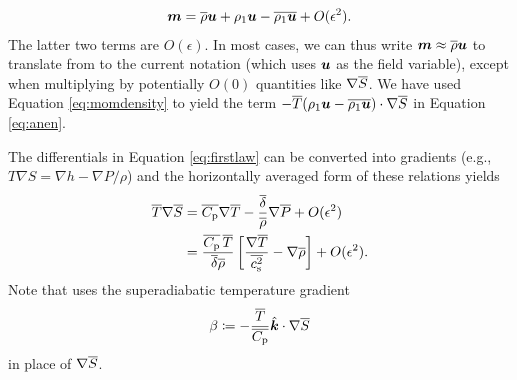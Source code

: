 \documentclass[12pt]{article}
\newcommand{\veck}{\hat{\bm{k}}}
\newcommand{\deltaref}{\overline{\delta}}
\newcommand{\cpref}{\overline{\cpcap}}
\newcommand{\cssqref}{\overline{\cs^2}}
\begin{document}
  \begin{align}\label{eq:momdensity}
  	\bm{m} = \overline{\rho}\bm{u} + \rho_1\bm{u} - \overline{\rho_1\bm{u}} + O(\epsilon^2).
  \end{align}
  The latter two terms are $O(\epsilon)$. In most cases, we can thus write $\bm{m} \approx \overline{\rho} \bm{u}$ to translate from \citet{Gough1969} to the current notation (which uses $\bm{u}$ as the field variable), except when multiplying by potentially $O(0)$ quantities like $\nabla\overline{S}$. We have used Equation \eqref{eq:momdensity} to yield the term $- \overline{T}(\rho_1\bm{u}-\overline{\rho_1\bm{u}})\cdot\nabla\overline{S}$ in Equation \eqref{eq:anen}. 
  
  The differentials in Equation \eqref{eq:firstlaw} can be converted into gradients (e.g., $T\nabla S= \nabla h - \nabla P/\rho$) and the horizontally averaged form of these relations yields 
  \begin{subequations}\label{eq:anfirstlaw}
  \begin{align}
  	\tmpref\nabla\sref &= \cpref\nabla\tmpref - \frac{\deltaref}{\rhoref}\nabla\prsref + O(\epsilon^2)\\
  	 &= \frac{\cpref\,\tmpref}{\deltaref\rhoref}\left[\frac{\nabla\tmpref}{\cssqref}-\nabla\rhoref\right]+O(\epsilon^2).
  \end{align}
  \end{subequations}
  Note that \citet{Gough1969} uses the superadiabatic temperature gradient
  \begin{align}
  	\beta\define -\frac{\tmpref}{\cpref}\veck\dotgrad\sref
  \end{align}
  in place of $\nabla \overline{S}$. 
  
\end{document}
